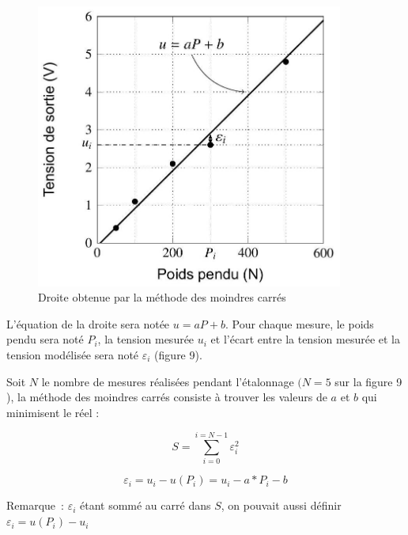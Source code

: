 \begin{figure}[!htb]
\begin{minipage}{0.5\textwidth}
\begin{center}
\includegraphics[width=0.9\textwidth]{images/2023_10_30_d11e80da56f59e3b3cdfg-07}
\caption{Droite obtenue par la méthode des moindres carrés \label{fig9}}
\end{center}
\end{minipage}
\end{figure}



L'équation de la droite sera notée $u=a P+b$. Pour chaque mesure, le poids pendu sera noté $P_{i}$, la tension mesurée $u_{i}$ et l'écart entre la tension mesurée et la tension modélisée sera noté $\varepsilon_{i}$ (figure 9).

Soit $N$ le nombre de mesures réalisées pendant l'étalonnage $(N=5$ sur la figure 9 ), la méthode des moindres carrés consiste à trouver les valeurs de $a$ et $b$ qui minimisent le réel :

$$
S=\sum_{i=0}^{i=N-1} \varepsilon_{i}^{2}
$$

\fi
{}
\ifprof
\begin{texteCache}

\[\varepsilon_{i} = u_{i} - u\left( P_{i} \right) = u_{i} - a*P_{i} - b\]

Remarque~: \(\varepsilon_{i}\) étant sommé au carré dans \(S\), on
pouvait aussi définir
\(\varepsilon_{i} = u\left( P_{i} \right) - u_{i}\)

\end{texteCache}
\else


